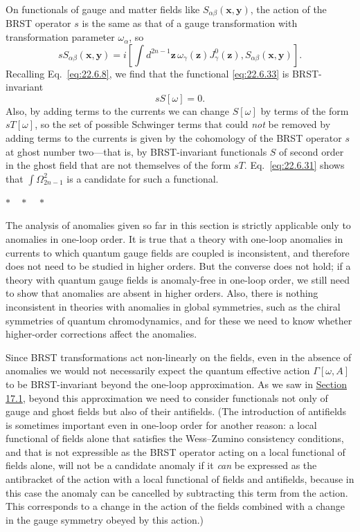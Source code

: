 On functionals of gauge and matter fields like
$S_{\alpha\beta}(\mathbf x,\mathbf y)$, the action of the BRST operator $s$
is the same as that of a gauge transformation with transformation
parameter $\omega_\alpha$, so
\[
 sS_{\alpha\beta}(\mathbf x,\mathbf y)
 =i\left[
 \int d^{2n-1}\mathbf z\,\omega_\gamma(\mathbf z)J^0_\gamma(\mathbf z),
 S_{\alpha\beta}(\mathbf x,\mathbf y)
 \right].
\]
Recalling Eq.~\eqref{eq:22.6.8}, we find that the functional
\eqref{eq:22.6.33} is BRST-invariant
\begin{equation}
 sS[\omega]=0.
 \tag{22.6.34}\label{eq:22.6.34}
\end{equation}
Also, by adding terms to the currents we can change $S[\omega]$ by terms
of the form $sT[\omega]$, so the set of possible Schwinger terms that
could \emph{not} be removed by adding terms to the currents is given by
the cohomology of the BRST operator $s$ at ghost number two---that is, by
BRST-invariant functionals $S$ of second order in the ghost field that are
not themselves of the form $sT$. Eq.~\eqref{eq:22.6.31} shows that
$\int\Omega^2_{2n-1}$ is a candidate for such a functional.

\begin{center}
$* \quad * \quad *$
\end{center}

The analysis of anomalies given so far in this section is strictly
applicable only to anomalies in one-loop order. It is true that a theory
with one-loop anomalies in currents to which quantum gauge fields are
coupled is inconsistent, and therefore does not need to be studied in
higher orders. But the converse does not hold; if a theory with quantum
gauge fields is anomaly-free in one-loop order, we still need to show that
anomalies are absent in higher orders. Also, there is nothing inconsistent
in theories with anomalies in global symmetries, such as the chiral
symmetries of quantum chromodynamics, and for these we need to know
whether higher-order corrections affect the anomalies.

Since BRST transformations act non-linearly on the fields, even in the
absence of anomalies we would not necessarily expect the quantum
effective action $\Gamma[\omega,A]$ to be BRST-invariant beyond the
one-loop approximation. As we saw in
\hyperref[sec:17.1]{Section 17.1}, beyond this approximation we need to
consider functionals not only of gauge and ghost fields but also of their
antifields. (The introduction of antifields is sometimes important even in
one-loop order for another reason: a local functional of fields alone that
satisfies the Wess--Zumino consistency conditions, and that is not
expressible as the BRST operator acting on a local functional of fields
alone, will not be a candidate anomaly if it \emph{can} be expressed as the
antibracket of the action with a local functional of fields and antifields,
because in this case the anomaly can be cancelled by subtracting this term
from the action. This corresponds to a change in the action of the fields
combined with a change in the gauge symmetry obeyed by this action.)

